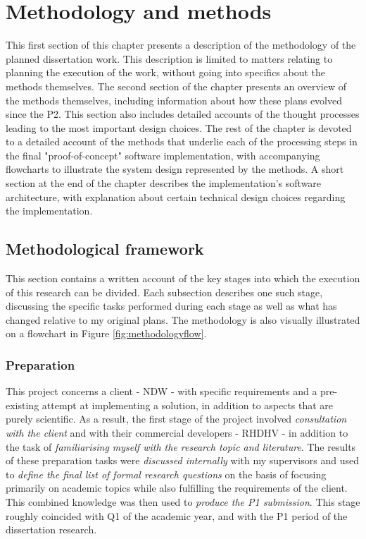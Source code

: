 
\chapter{Methodology and methods}
\label{chap:mm}

This first section of this chapter presents a description of the methodology of the planned dissertation work. This description is limited to matters relating to planning the execution of the work, without going into specifics about the methods themselves. The second section of the chapter presents an overview of the methods themselves, including information about how these plans evolved since the P2. This section also includes detailed accounts of the thought processes leading to the most important design choices. The rest of the chapter is devoted to a detailed account of the methods that underlie each of the processing steps in the final "proof-of-concept" software implementation, with accompanying flowcharts to illustrate the system design represented by the methods. A short section at the end of the chapter describes the implementation's software architecture, with explanation about certain technical design choices regarding the implementation.

\section{Methodological framework}
\label{sec:methodology}

This section contains a written account of the key stages into which the execution of this research can be divided. Each subsection describes one such stage, discussing the specific tasks performed during each stage as well as what has changed relative to my original plans. The methodology is also visually illustrated on a flowchart in Figure \ref{fig:methodologyflow}.

\subsection{Preparation}
\label{sub:preparation}

This project concerns a client - NDW - with specific requirements and a pre-existing attempt at implementing a solution, in addition to aspects that are purely scientific. As a result, the first stage of the project involved \textit{consultation with the client} and with their commercial developers - RHDHV - in addition to the task of \textit{familiarising myself with the research topic and literature}. The results of these preparation tasks were \textit{discussed internally} with my supervisors and used to \textit{define the final list of formal research questions} on the basis of focusing primarily on academic topics while also fulfilling the requirements of the client. This combined knowledge was then used to \textit{produce the P1 submission}. This stage roughly coincided with Q1 of the academic year, and with the P1 period of the dissertation research.

